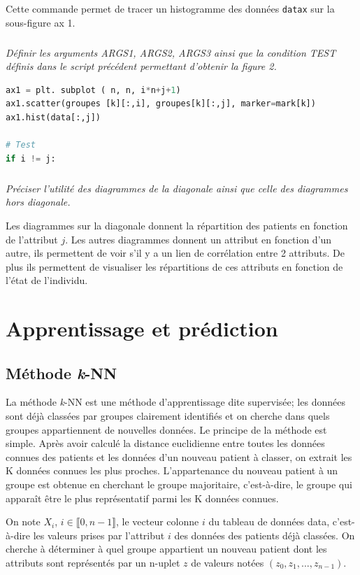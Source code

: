 Cette commande permet de tracer un histogramme des données \texttt{datax} sur la sous-figure ax 1.

\fi

\subparagraph{}\textit{Définir les arguments ARGS1, ARGS2, ARGS3 ainsi que la condition TEST définis dans le
script précédent permettant d’obtenir la figure 2.}
\ifprof
\begin{corrige}
\begin{lstlisting}[language=Python]
ax1 = plt. subplot ( n, n, i*n+j+1)
ax1.scatter(groupes [k][:,i], groupes[k][:,j], marker=mark[k])
ax1.hist(data[:,j])

# Test
if i != j:
\end{lstlisting}
\end{corrige}
\else
\fi

\subparagraph{}\textit{Préciser l’utilité des diagrammes de la diagonale ainsi que celle des diagrammes hors diagonale.}
\ifprof
\begin{corrige}
Les diagrammes sur la diagonale donnent la répartition des patients en fonction de l’attribut $j$.
Les autres diagrammes donnent un attribut en fonction d’un autre, ils permettent de
voir s’il y a un lien de corrélation entre 2 attributs. De plus ils permettent de visualiser
les répartitions de ces attributs en fonction de l’état de l’individu.
\end{corrige}
\else
\fi


\section{Apprentissage et prédiction}

\subsection{Méthode \textit{k}-NN}
\ifprof
\else
La méthode \textit{k}-NN est une méthode d’apprentissage dite supervisée; les données sont déjà classées par
groupes clairement identifiés et on cherche dans quels groupes appartiennent de nouvelles données.
Le principe de la méthode est simple. Après avoir calculé la distance euclidienne entre toutes les
données connues des patients et les données d’un nouveau patient à classer, on extrait les K données
connues les plus proches. L’appartenance du nouveau patient à un groupe est obtenue en cherchant le
groupe majoritaire, c’est-à-dire, le groupe qui apparaît être le plus représentatif parmi les K données
connues.

On note $X_i$, $i \in \llbracket 0,n-1 \rrbracket $, le vecteur colonne $i$ du tableau de données data, c’est-à-dire les valeurs
prises par l’attribut $i$ des données des patients déjà classées. On cherche à déterminer à quel groupe
appartient un nouveau patient dont les attributs sont représentés par un n-uplet $z$ de valeurs notées
$\left(z_0, z_1, ..., z_{n-1} \right)$.
\fi
